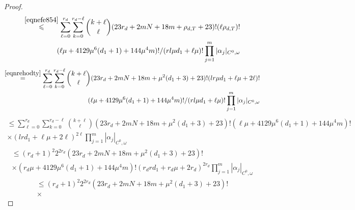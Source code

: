 \documentclass[10pt,a4paper]{amsart}
\renewcommand{\leq}{\leqslant}
\begin{document}
\begin{proof}
\begin{equation}
\begin{aligned}
			\overset{\textnormal{\eqref{eqnefe854}}}{\leq}
			\sum_{\ell = 0}^{r_d} \sum_{k=0}^{r_d-\ell}  {k+\ell \choose \ell} (23r_d + 2 m N + 18m +\rho_{d,T}+23)!(\ell\rho_{d,T})! \\
			(\ell\mu+ 4129\mu^6(d_1+1) + 144\mu^4m)!
			/ (rl\mu d_1 + \ell\mu)!
			\prod_{j=1}^m |\alpha_j|_{C^0,\omega}
		\end{aligned}
	\end{equation}
	\begin{equation}
		\begin{aligned}
			\overset{\textnormal{\eqref{eqnrehodty}}}{=}
			\sum_{\ell = 0}^{r_d} \sum_{k=0}^{r_d-\ell}  {k+\ell \choose \ell} (23r_d + 2 m N + 18m+\mu^2(d_1+3)+23)!(lr\mu d_1 + \ell\mu+2\ell)! \\
			(\ell\mu+ 4129\mu^6(d_1+1) + 144\mu^4m)!
			/ (rl\mu d_1 + \ell\mu)!
			\prod_{j=1}^m |\alpha_j|_{C^0,\omega}
		\end{aligned}
	\end{equation}
	\begin{equation}
		\begin{aligned}
			\leq
			\sum_{\ell = 0}^{r_d} \sum_{k=0}^{r_d-\ell}  {k+\ell \choose \ell} (23r_d + 2 m N + 18m+\mu^2(d_1+3)+23)!
			(\ell\mu+ 4129\mu^6(d_1+1) + 144\mu^4m)! \\  \times (lrd_1+\ell\mu+2\ell)^{2\ell}
			\prod_{j=1}^m |\alpha_j|_{C^0,\omega}
		\end{aligned}
	\end{equation}
	\begin{equation}
		\begin{aligned}
			\leq
			(r_d+1)^2 2^{2r_d} (23r_d + 2 m N + 18m+\mu^2(d_1+3)+23)! \\ \times
			(r_d\mu+ 4129\mu^6(d_1+1) + 144\mu^4m)! (r_dr d_1+r_d\mu+2r_d)^{2r_d}
			\prod_{j=1}^m |\alpha_j|_{C^0,\omega}
		\end{aligned}
	\end{equation}
	\begin{equation}
		\begin{aligned}
			\leq
			(r_d+1)^2 2^{2r_d} (23r_d + 2 m N + 18m+\mu^2(d_1+3)+23)! \\ \times

\end{aligned}
\end{equation}
\end{proof}
\end{document}
